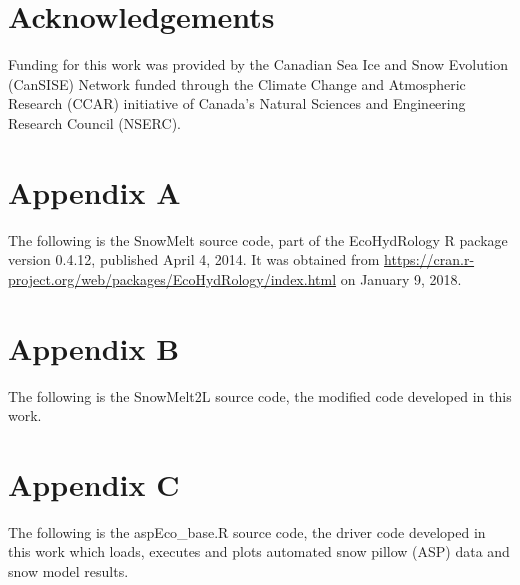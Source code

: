 \documentclass[12pt]{article}
\begin{document}
\section{Acknowledgements}
Funding for this work was provided by the Canadian Sea Ice and Snow Evolution (CanSISE) Network funded through the Climate Change and Atmospheric Research (CCAR) initiative of Canada's Natural Sciences and Engineering Research Council (NSERC).  





\begin{landscape}
\pagestyle{empty}


\section{Appendix A}
The following is the SnowMelt source code, part of the EcoHydRology R package version 0.4.12, published April 4, 2014.
It was obtained from \url{https://cran.r-project.org/web/packages/EcoHydRology/index.html} on January 9, 2018.

\bigskip



\newpage
\section{Appendix B}
The following is the SnowMelt2L source code, the modified code developed in this work.

\bigskip



\newpage
\section{Appendix C}
The following is the aspEco\_base.R source code, the driver code developed in this work which loads, executes and plots automated snow pillow (ASP) data and snow model results.

\bigskip




\end{landscape}
\end{document}
